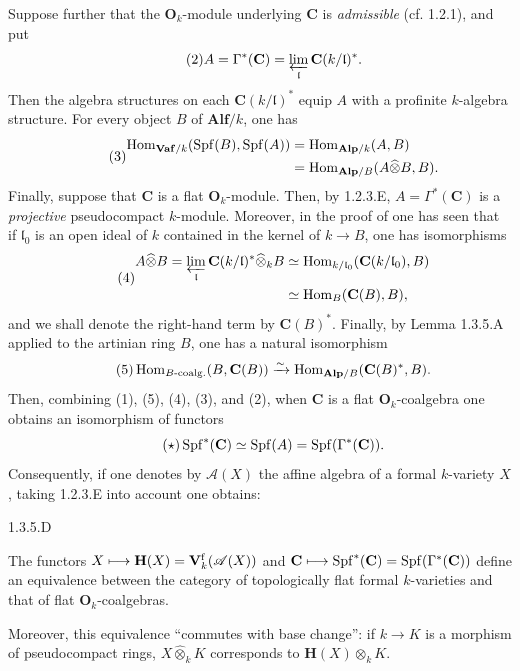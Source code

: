 Suppose further that the $\mathbf O_k$-module underlying $\mathbf C$ is \emph{admissible} (cf. 1.2.1), and put
\begin{equation}\tag{2}
A=\Gamma^*(\mathbf C)=\varprojlim_{\mathfrak l}\mathbf C(k/\mathfrak l)^*.
\end{equation}
Then the algebra structures on each $\mathbf C(k/\mathfrak l)^*$ equip $A$ with a profinite $k$-algebra structure. For every object $B$ of $\mathbf{Alf}/k$, one has
\begin{equation}\tag{3}
\begin{aligned}
\operatorname{Hom}_{\mathbf{Vaf}/k}(\operatorname{Spf}(B),\operatorname{Spf}(A))&=\operatorname{Hom}_{\mathbf{Alp}/k}(A,B)\\
&=\operatorname{Hom}_{\mathbf{Alp}/B}(A\widehat\otimes B,B).
\end{aligned}
\end{equation}
Finally, suppose that $\mathbf C$ is a flat $\mathbf O_k$-module. Then, by 1.2.3.E, $A=\Gamma^*(\mathbf C)$ is a \emph{projective} pseudocompact $k$-module. Moreover, in the proof of \loccit one has seen that if $\mathfrak l_0$ is an open ideal of $k$ contained in the kernel of $k\to B$, one has isomorphisms
\begin{equation}\tag{4}
\begin{aligned}
A\widehat\otimes B=\varprojlim_{\mathfrak l}\mathbf C(k/\mathfrak l)^*\widehat\otimes_k B
&\simeq\operatorname{Hom}_{k/\mathfrak l_0}(\mathbf C(k/\mathfrak l_0),B)\\
&\simeq\operatorname{Hom}_B(\mathbf C(B),B),
\end{aligned}
\end{equation}
and we shall denote the right-hand term by $\mathbf C(B)^*$. Finally, by Lemma 1.3.5.A applied to the artinian ring $B$, one has a natural isomorphism
\begin{equation}\tag{5}
\operatorname{Hom}_{B\text{-}\mathrm{coalg.}}(B,\mathbf C(B))\xrightarrow{\sim}\operatorname{Hom}_{\mathbf{Alp}/B}(\mathbf C(B)^*,B).
\end{equation}
Then, combining (1), (5), (4), (3), and (2), when $\mathbf C$ is a flat $\mathbf O_k$-coalgebra one obtains an isomorphism of functors
\begin{equation}\tag{$\star$}
\operatorname{Spf}^*(\mathbf C)\simeq\operatorname{Spf}(A)=\operatorname{Spf}(\Gamma^*(\mathbf C)).
\end{equation}
Consequently, if one denotes by $\mathscr A(X)$ the affine algebra of a formal $k$-variety $X$, taking 1.2.3.E into account one obtains:
\begin{proposition}{1.3.5.D}\label{VIIB.1.3.5.D}
\begin{enumeratei}
\item The functors $X\longmapsto\mathbf H(X)=\mathbf V_k^{\mathrm f}(\mathscr A(X))$ and $\mathbf C\longmapsto\operatorname{Spf}^*(\mathbf C)=\operatorname{Spf}(\Gamma^*(\mathbf C))$ define an equivalence between the category of topologically flat formal $k$-varieties and that of flat $\mathbf O_k$-coalgebras.
\item Moreover, this equivalence ``commutes with base change'': if $k\to K$ is a morphism of pseudocompact rings, $X\widehat\otimes_k K$ corresponds to $\mathbf H(X)\otimes_k K$.
\end{enumeratei}
\end{proposition}

